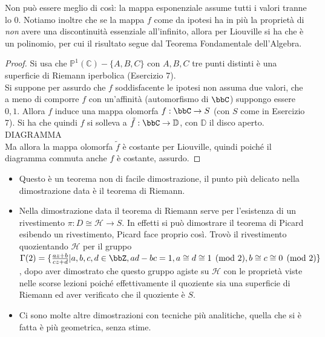 \begin{osservazione}
	Non può essere meglio di così: la mappa esponenziale assume tutti i valori tranne lo $0$. Notiamo inoltre che se la mappa $f$ come da ipotesi ha in più la proprietà di \emph{non} avere una discontinuità essenziale all'infinito, allora per Liouville si ha che è un polinomio, per cui il risultato segue dal Teorema Fondamentale dell'Algebra.
\end{osservazione}


\begin{proof}
Si usa che $\mathbb{P}^1(\mathbb{C})\minus\{ A, B, C\}$ con $A, B, C$ tre punti distinti è una superficie di Riemann iperbolica (Esercizio 7).\\
Si suppone per assurdo che $f$ soddisfacente le ipotesi non assuma due valori, che a meno di comporre $f$ con un'affinità (automorfismo di $\bbC$) suppongo essere $0,1$.
Allora $f$ induce una mappa olomorfa $f:\bbC \rightarrow S$ (con $S$ come in Esercizio 7).
	Si ha che quindi $f$ si solleva a $\tilde{f}:\bbC\rightarrow \mathbb{D}$, con $\mathbb{D}$ il disco aperto. DIAGRAMMA \\
Ma allora la mappa olomorfa $\tilde{f}$ è costante per Liouville, quindi poiché il diagramma commuta anche $f$ è costante, assurdo.
\end{proof}

\begin{osservazione}
\begin{itemize}
\item Questo è un teorema non di facile dimostrazione, il punto più delicato nella dimostrazione data è il teorema di Riemann.
\item Nella dimostrazione data il teorema di Riemann serve per l'esistenza di un rivestimento $\pi:D\cong \mathcal{H} \rightarrow S$. In effetti si può dimostrare il teorema di Picard esibendo un rivestimento, Picard face proprio così. Trovò il rivestimento quozientando $\mathcal{H}$ per il gruppo $\Gamma(2)=\{ \frac{az+b}{cz+d} | a,b,c,d\in \bbZ, ad-bc=1, a\cong d \cong 1 \pmod{2}, b\cong c \cong 0 \pmod{2} \}$, dopo aver dimostrato che questo gruppo agiste su $\mathcal{H}$ con le proprietà viste nelle scorse lezioni poiché effettivamente il quoziente sia una superficie di Riemann ed aver verificato che il quoziente è $S$.
\item Ci sono molte altre dimostrazioni con tecniche più analitiche, quella che si è fatta è più geometrica, senza stime. 
\end{itemize}
\end{osservazione}


